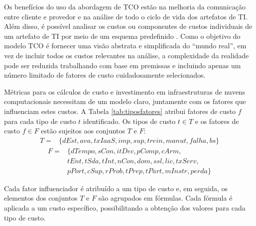 \documentclass[tese,capa]{texufpel}
\begin{document}
Os benefícios do uso da abordagem de TCO estão na melhoria da comunicação entre cliente e provedor e na análise de todo o ciclo de vida dos artefatos de TI. Além disso, é possível analisar os custos ou componentes de custos individuais de um artefato de TI por meio de um esquema predefinido \cite{walterbuschEvaluatingCloudComputing2013}. Como o objetivo do modelo TCO é fornecer uma visão abstrata e simplificada do ``mundo real'', em vez de incluir todos os custos relevantes na análise, a complexidade da realidade pode ser reduzida trabalhando com base em premissas e incluindo apenas um número limitado de fatores de custo cuidadosamente selecionados.

Métricas para os cálculos de custo e investimento em infraestruturas de nuvens computacionais necessitam de um modelo claro, juntamente com os fatores que influenciam estes custos. A Tabela \ref{tab:tiposfatores} atribui fatores de custo $f$ para cada tipo de custo $t$ identificado. Os tipos de custo $t \in T$ e os fatores de custo $f \in F$ estão sujeitos aos conjuntos $T$ e $F$:
\begin{equation*}
  \begin{aligned}
    T = {} & \{dEst,ava,txIaaS,imp,sup,trein,manut,falha,bs\}
  \end{aligned}
\end{equation*}
\begin{equation*}
  \begin{aligned}
    F = {} & \{dTempo,sCon,itDec,pComp,cArm,\\ 
           & tEnt,tSda,tInt,nCon,dom,ssl,lic,txServ,\\
           & pPort,cSup,rProb,tPrep,tPart,mInstr,perda\}
  \end{aligned}
\end{equation*}

Cada fator influenciador é atribuído a um tipo de custo e, em seguida, os elementos dos conjuntos $T$ e $F$ são agrupados em fórmulas. Cada fórmula é aplicada a um custo específico, possibilitando a obtenção dos valores para cada tipo de custo.
\end{document}
